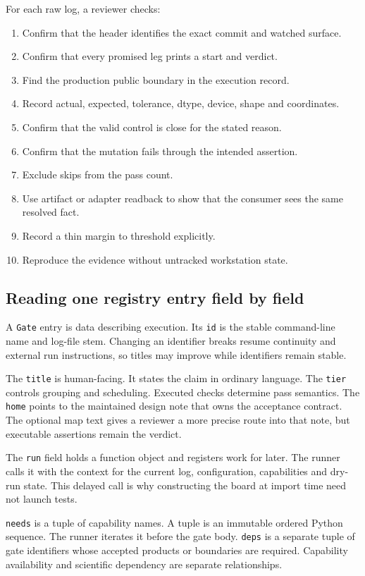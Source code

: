 \documentclass[10pt,aps,prd,twocolumn,nofootinbib]{revtex4-2}
\newcommand{\code}[1]{\texttt{#1}}
\begin{document}
For each raw log, a reviewer checks:
\begin{enumerate}
  \item Confirm that the header identifies the exact commit and watched surface.
  \item Confirm that every promised leg prints a start and verdict.
  \item Find the production public boundary in the execution record.
  \item Record actual, expected, tolerance, dtype, device, shape and coordinates.
  \item Confirm that the valid control is close for the stated reason.
  \item Confirm that the mutation fails through the intended assertion.
  \item Exclude skips from the pass count.
  \item Use artifact or adapter readback to show that the consumer sees the
        same resolved fact.
  \item Record a thin margin to threshold explicitly.
  \item Reproduce the evidence without untracked workstation state.
\end{enumerate}

\subsection{Reading one registry entry field by field}

A \code{Gate} entry is data describing execution.  Its \code{id} is the stable
command-line name and log-file stem.  Changing an identifier breaks resume
continuity and external run instructions, so titles may improve while
identifiers remain stable.

The \code{title} is human-facing.  It states the claim in ordinary language.
The \code{tier} controls grouping and scheduling.  Executed checks determine
pass semantics.  The
\code{home} points to the maintained design note that owns the acceptance
contract.  The optional map text gives a reviewer a more precise route into
that note, but executable assertions remain the verdict.

The \code{run} field holds a function object and registers work for later.
The runner calls it with the context for the current log, configuration,
capabilities and dry-run state.  This delayed
call is why constructing the board at import time need not launch tests.

\code{needs} is a tuple of capability names.  A tuple is an immutable ordered
Python sequence.  The runner iterates it before the gate body.  \code{deps} is
a separate tuple of gate identifiers whose accepted products or boundaries
are required.  Capability availability and scientific dependency are
separate relationships.
\end{document}

